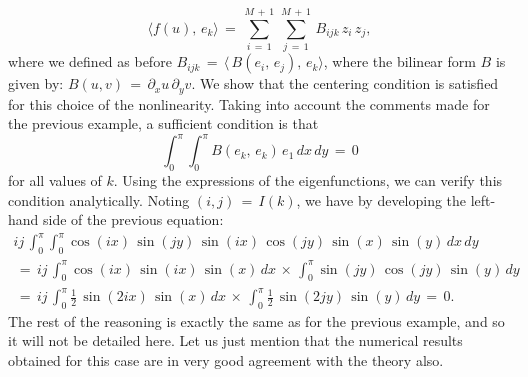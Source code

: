 \begin{equation}
    \langle f(u),\,e_k\rangle \,=\,\sum_{ i\,=\,1}^{ M\,+\,1}\, \sum_{ j\,=\,1}^{ M\,+\,1}\,B_{ijk}\,z_i\,z_j,
    \label{eq: projection nonlin example}
\end{equation}
where we defined as before $B_{ijk} \,=\, \langle\, B(e_i,\,e_j),\,e_k \rangle$, where the bilinear form $B$ is given by: $B(u,v) \,=\, {\partial}_x u \, {\partial}_y v$. We show that the centering condition is satisfied for this choice of the nonlinearity. Taking into account the comments made for the previous example, a sufficient condition is that
$$
\int_{ 0}^{ {\pi}}\int_{ 0}^{ {\pi}} B(e_k,\,e_k) \, e_1 \, dx\, dy \,=\,0
$$
for all values of $k$. Using the expressions of the eigenfunctions, we can verify this condition analytically. Noting $(i,j) \,=\,I(k)$, we have by developing the left-hand side of the previous equation:
\begin{multline*}
    ij\,\int_{ 0}^{ {\pi}} \int_{ 0}^{ {\pi}} \cos(ix)\,\sin(jy)\,\sin(ix)\,\cos(jy)\,\sin(x)\,\sin(y)\, dx\, dy \\\,=\, ij\,\int_0^{\pi}\cos(ix)\,\sin(ix)\, \sin(x) \, dx \,{\times}\, \int_{ 0}^{ {\pi}} \sin(jy)\, \cos(jy)\, \sin(y)\,dy \\ \,=\, ij\,\int_{ 0}^{ {\pi}} \frac{1}{2}\,\sin(2ix)\,\sin(x) \, dx \,{\times}\,\int_{ 0}^{ {\pi}} \frac{1}{2}\,\sin(2jy)\,\sin(y)\,dy\,=\,0.
\end{multline*}
The rest of the reasoning is exactly the same as for the previous example, and
so it will not be detailed here. Let us just mention that the numerical results
obtained for this case are in very good agreement with the theory also.

